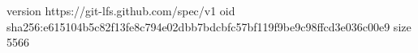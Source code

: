 version https://git-lfs.github.com/spec/v1
oid sha256:e615104b5c82f13fe8c794e02dbb7bdcbfc57bf119f9be9c98ffcd3e036c00e9
size 5566
